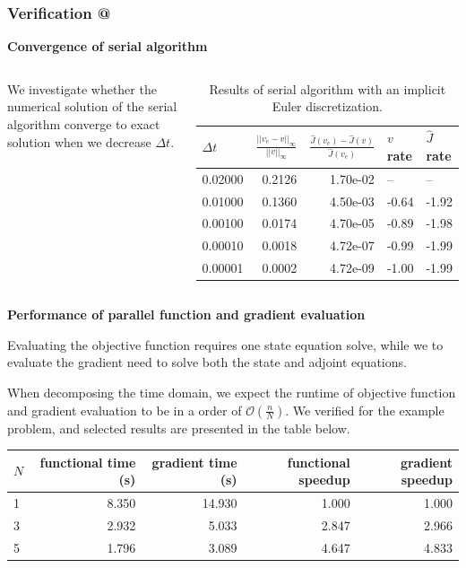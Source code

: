 \documentclass[9pt]{beamer}
\makeatletter
\newcommand*{\rom}[1]{\expandafter\@slowromancap\romannumeral #1@}
\makeatother
\begin{document}
\begin{frame}
\frametitle{Verification \rom{3}}
\textbf{Convergence of serial algorithm}
\begin{columns}
\begin{itemize}
{\small
\item{We investigate whether the numerical solution of the serial algorithm converge to exact solution when we decrease $\Delta t$.}
}
\end{itemize}
{\tiny
\begin{table}[!h]
\caption{{\tiny Results of serial algorithm with an implicit Euler discretization.}} \label{IE_convergence}
\centering
\begin{tabular}{lrrll}
\toprule
{} $\Delta t$&    $\frac{||v_e-v||_{\infty}}{||v||_{\infty}}$ &  $\frac{\hat J(v_e)-\hat J(v)}{\hat J(v_e)}$ & $v$ rate & $\hat J$  rate \\
\midrule
0.02000 &  0.2126 &  1.70e-02 &        -- &       -- \\
0.01000 &  0.1360 &  4.50e-03 & -0.64 & -1.92 \\
0.00100 &  0.0174 &  4.70e-05 & -0.89 & -1.98 \\
0.00010 &  0.0018 &  4.72e-07 &   -0.99 & -1.99 \\
0.00001 &  0.0002 &  4.72e-09 &  -1.00 & -1.99 \\
\bottomrule
\end{tabular}
\end{table}}
\end{columns}
\textbf{Performance of parallel function and gradient evaluation}
\begin{itemize}
{\small
\item{Evaluating the objective function requires one state equation solve, while we to evaluate the gradient need to solve both the state and adjoint equations.}
\item{When decomposing the time domain, we expect the runtime of objective function and gradient evaluation to be in a order of $\mathcal{O}(\frac{n}{N})$. We verified for the example problem, and selected results are presented in the table below. }}
\end{itemize}
{\tiny
\begin{table}[!h]
\centering
\begin{tabular}{lrrrr}
\toprule
{}$N$ &  functional time (s) &  gradient time (s) &  functional speedup &  gradient speedup \\
\midrule
1 &           8.350 &         14.930 &            1.000 &          1.000 \\
3 &           2.932 &          5.033 &            2.847 &          2.966 \\
5 &           1.796 &          3.089 &            4.647 &          4.833 \\
\bottomrule
\end{tabular}
\end{table}}
\end{frame}
\end{document}
